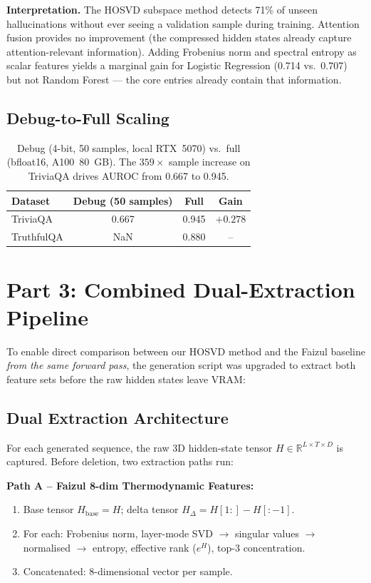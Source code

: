 \documentclass[11pt,a4paper]{article}
\begin{document}
\noindent
\textbf{Interpretation.}  The HOSVD subspace method detects 71\% of unseen
hallucinations without ever seeing a validation sample during training.
Attention fusion provides no improvement (the compressed hidden states already
capture attention-relevant information).  Adding Frobenius norm and spectral
entropy as scalar features yields a marginal gain for Logistic Regression
(0.714 vs.\ 0.707) but not Random Forest — the core entries already contain
that information.

\subsection{Debug-to-Full Scaling}

\begin{table}[h]
\centering
\begin{tabular}{lccc}
\toprule
\textbf{Dataset} & \textbf{Debug (50 samples)} & \textbf{Full} & \textbf{Gain} \\
\midrule
TriviaQA    & 0.667 & 0.945 & $+0.278$ \\
TruthfulQA  & NaN   & 0.880 & -- \\
\bottomrule
\end{tabular}
\caption{Debug (4-bit, 50 samples, local RTX~5070) vs.\ full (bfloat16,
         A100~80~GB).  The $359\times$ sample increase on TriviaQA drives
         AUROC from 0.667 to 0.945.}
\end{table}

\section{Part 3: Combined Dual-Extraction Pipeline}

To enable direct comparison between our HOSVD method and the Faizul baseline
\emph{from the same forward pass}, the generation script was upgraded to
extract both feature sets before the raw hidden states leave VRAM:

\subsection{Dual Extraction Architecture}

For each generated sequence, the raw 3D hidden-state tensor $H \in
\mathbb{R}^{L \times T \times D}$ is captured.  Before deletion, two
extraction paths run:

\medskip
\noindent
\textbf{Path A -- Faizul 8-dim Thermodynamic Features:}
\begin{enumerate}
  \item Base tensor $H_{\text{base}} = H$; delta tensor $H_{\Delta} = H[1:] - H[:-1]$.
  \item For each: Frobenius norm, layer-mode SVD $\to$ singular values $\to$
        normalised $\to$ entropy, effective rank ($e^H$), top-3 concentration.
  \item Concatenated: 8-dimensional vector per sample.
\end{enumerate}
\end{document}
